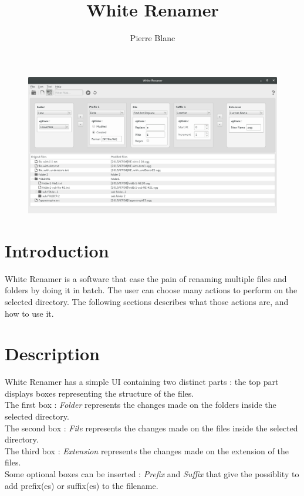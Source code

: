 \documentclass[11pt, a4paper]{scrartcl}
\title{\Huge\textbf{White Renamer}}
\date{}
\author{Pierre Blanc}
\begin{document}
\renewcommand{\labelitemi}{$\bullet$}

\maketitle
\setlength{\parindent}{0pt}
\begin{figure}[!h]
        \centering
        \includegraphics[width=1\textwidth]{MainLayout.png}
        \label{MainLayout}
\end{figure}
\break
\section{Introduction}
White Renamer is a software that ease the pain of renaming multiple files and folders by doing it in batch. The user can choose many actions to perform on the selected directory. The following sections describes what those actions are, and how to use it.

\section{Description}
White Renamer has a simple UI containing two distinct parts : the top part displays boxes representing the structure of the files. \\
The first box : \emph{Folder} represents the changes made on the folders inside the selected directory.\\
The second box : \emph{File} represents the changes made on the files inside the selected directory.\\
The third box : \emph{Extension} represents the changes made on the extension of the files.\\
Some optional boxes can be inserted : \emph{Prefix} and \emph{Suffix} that give the possiblity to add prefix(es) or suffix(es) to the filename.\\
\end{document}
